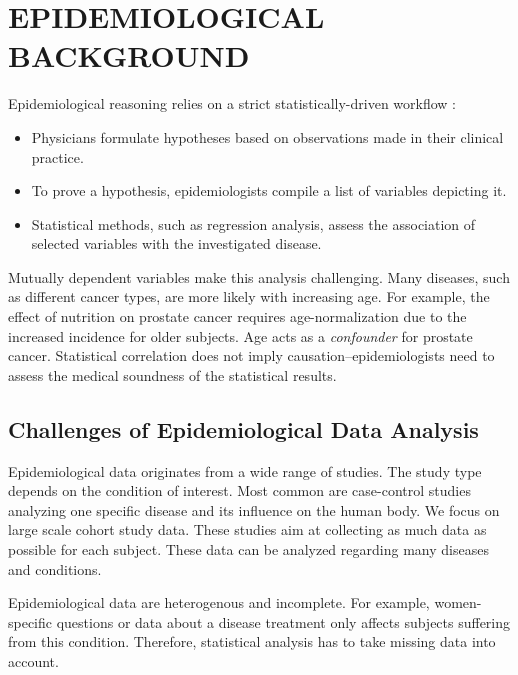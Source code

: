 \documentclass[a4paper,twoside]{style/article}
\begin{document}
\section{\uppercase{Epidemiological Background}}
\label{sec:EpidemiologicalBackground}
\noindent Epidemiological reasoning relies on a strict statistically-driven workflow \cite{Fletcher}:
\begin{itemize}
	\item Physicians formulate hypotheses based on observations made in their clinical practice.
	\item To prove a hypothesis, epidemiologists compile a list of variables depicting it.
	\item Statistical methods, such as regression analysis, assess the association of selected variables with the investigated disease.
\end{itemize}
Mutually dependent variables make this analysis challenging.
Many diseases, such as different cancer types, are more likely with increasing age.
For example, the effect of nutrition on prostate cancer requires age-normalization due to the increased incidence for older subjects.
Age acts as a \emph{confounder} for prostate cancer.
Statistical correlation does not imply causation--epidemiologists need to assess the medical soundness of the statistical results.
\subsection{Challenges of Epidemiological Data Analysis}
Epidemiological data originates from a wide range of studies.
The study type depends on the condition of interest.
Most common are case-control studies analyzing one specific disease and its influence on the human body.
We focus on large scale cohort study data.
These studies aim at collecting as much data as possible for each subject.
These data can be analyzed regarding many diseases and conditions.

Epidemiological data are heterogenous and incomplete.
For example, women-specific questions or data about a disease treatment only affects subjects suffering from this condition.
Therefore, statistical analysis has to take missing data into account.
\end{document}
